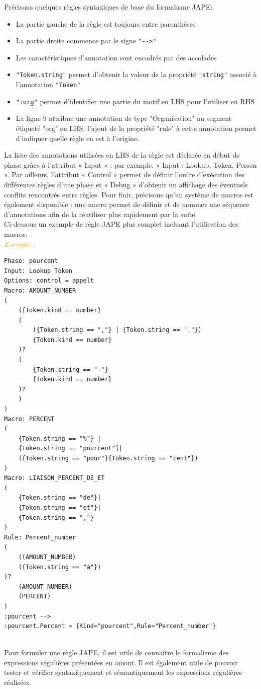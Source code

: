 \documentclass[a4paper, 11pt]{report}
\newenvironment{exemple}
    {
    \textit{\textcolor{orange}{
    Exemple : \\}}
    }
    {~\\
    }
\begin{document}
Précisons quelques règles syntaxiques de base du formalisme JAPE:
\begin{itemize}
    \item La partie gauche de la règle est toujours entre parenthèses
    \item La partie droite commence par le signe \verb|"-->"|
    \item Les caractéristiques d'annotation sont encadrés par des accolades
    \item \verb|"Token.string"| permet d'obtenir la valeur de la propriété \verb|"string"| associé à l'annotation \verb|"Token"|
    \item \verb|":org"| permet d'identifier une partie du motif en LHS pour l'utiliser en RHS
    \item La ligne 9 attribue une annotation de type "Organisation" au segment étiqueté "org" en LHS; l'ajout de la propriété "rule" à cette annotation permet d'indiquer quelle règle en est à l'origine.
\end{itemize}
La liste des annotations utilisées en LHS de la règle est déclarée en début de phase grâce à l'attribut « Input » : par exemple, « Input : Lookup, Token, Person ». Par ailleurs, l'attribut « Control » permet de définir l'ordre d'exécution des différentes règles d'une phase et « Debug »
d'obtenir un affichage des éventuels conflits rencontrés entre règles.
Pour finir, précisons qu'un système de macros est également disponible : une macro permet
de définir et de nommer une séquence d'annotations afin de la réutiliser plus rapidement par la suite.\cite{SL10}\\
Ci-dessous un exemple de règle JAPE plus complet incluant l'utilisation des macros:\\
\begin{exemple}
\begin{verbatim}
Phase: pourcent
Input: Lookup Token
Options: control = appelt
Macro: AMOUNT_NUMBER
(
    ({Token.kind == number}
    (
        ({Token.string == ","} | {Token.string == "."})
        {Token.kind == number}
    )?
    (
        {Token.string == "-"}
        {Token.kind == number}
    )?
    )
)
Macro: PERCENT
(
    {Token.string == "%"} |
    {Token.string == "pourcent"}|
    ({Token.string == "pour"}{Token.string == "cent"})
)
Macro: LIAISON_PERCENT_DE_ET
(
    {Token.string == "de"}|
    {Token.string == "et"}|
    {Token.string == ","}
)
Rule: Percent_number
(
    ((AMOUNT_NUMBER)
    ({Token.string == "à"})
)?
    (AMOUNT_NUMBER)
    (PERCENT)
)
:pourcent -->
:pourcent.Percent = {Kind="pourcent",Rule="Percent_number"}
\end{verbatim}
\end{exemple}
Pour formuler une règle JAPE, il est utile de connaître le formalisme des expressions régulières présentées en amont. Il est également utile de pouvoir tester et vérifier syntaxiquement et sémantiquement les expressions régulières réalisées.
\newpage
\end{document}

